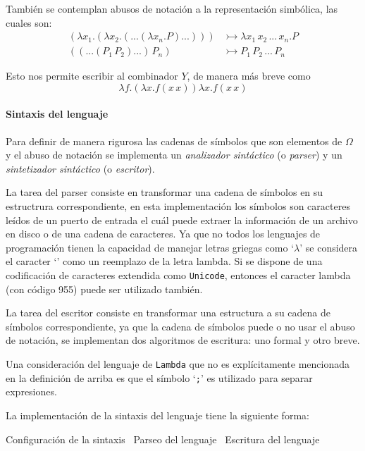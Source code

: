 \documentclass[10pt,oneside,openany,letterpaper]{book}
\begin{document}
También se contemplan abusos de notación a la representación simbólica, las cuales son:
\begin{align*}
  (λx_{1}.(λx_{2}.(...(λx_{n}.P)...))) &\rightarrowtail λx_{1}\, x_{2}\, ...\, x_{n}.P\\
  ((...(P_{1}\, P_{2})...)\, P_{n}) &\rightarrowtail P_{1}\, P_{2}\, ...\, P_{n}
\end{align*}

Esto nos permite escribir al combinador \( Y \), de manera más breve como
\[ λf.(λx.f(x\, x))λx.f(x\, x) \]

\paragraph{Sintaxis del lenguaje} Para definir de manera rigurosa las cadenas de símbolos que son elementos de \( Ω \) y el abuso de notación se implementa un \emph{analizador sintáctico} (o \emph{parser}) y un \emph{sintetizador sintáctico} (o \emph{escritor}).

La tarea del parser consiste en transformar una cadena de símbolos en su estructrura correspondiente, en esta implementación los símbolos son caracteres leídos de un puerto de entrada el cuál puede extraer la información de un archivo en disco o de una cadena de caracteres. Ya que no todos los lenguajes de programación tienen la capacidad de manejar letras griegas como `\( \lambda \)' se considera el caracter `{\tt{}{}}' como un reemplazo de la letra lambda. Si se dispone de una codificación de caracteres extendida como {\tt{}Unicode}, entonces el caracter lambda (con código 955) puede ser utilizado también.

La tarea del escritor consiste en transformar una estructura a su cadena de símbolos correspondiente, ya que la cadena de símbolos puede o no usar el abuso de notación, se implementan dos algoritmos de escritura: uno formal y otro breve.

Una consideración del lenguaje de {\tt{}Lambda} que no es explícitamente mencionada en la definición de arriba es que el símbolo `{\tt{};}' es utilizado para separar expresiones.

La implementación de la sintaxis del lenguaje tiene la siguiente forma:

\nwenddocs{}\endmoddef
\LA{}Configuración de la sintaxis~{\nwtagstyle{}}\RA{}
\LA{}Parseo del lenguaje~{\nwtagstyle{}}\RA{}
\LA{}Escritura del lenguaje~{\nwtagstyle{}}\RA{}
\nwendcode{}\nwdocspar
\end{document}
